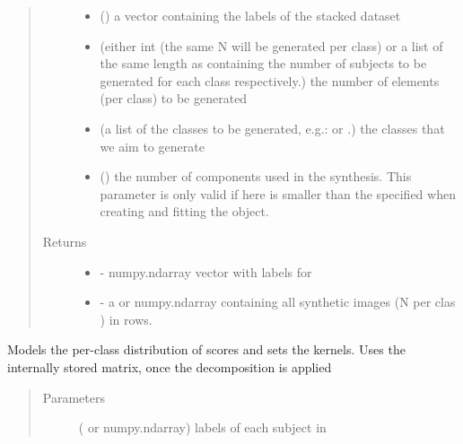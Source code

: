 \documentclass[letterpaper,10pt,english]{sphinxmanual}
\begin{document}
\begin{fulllineitems}
\begin{fulllineitems}
\begin{quote}
\begin{description}
\begin{itemize}
\item {} 
 () \textendash{} a vector containing the labels of the stacked dataset

\item {} 
 (either int (the same N will be generated per class) or a list        of the same length as  containing the number of subjects to         be generated for each class respectively.) \textendash{} the number of elements (per class) to be generated

\item {} 
 (a list of the classes to be generated, e.g.: \sphinxtitleref{{[}0, 2{]}}         or \sphinxtitleref{{[}‘AD’, ‘CTL’{]}}.) \textendash{} the classes that we aim to generate

\item {} 
 () \textendash{} the number of components used in the synthesis.         This parameter is only valid if  here is smaller than the         specified when creating and fitting the         object.

\end{itemize}

\item[{Returns}] \leavevmode
\begin{itemize}
\item {} 
 - numpy.ndarray vector with labels for 

\item {} 
 - a  or numpy.ndarray containing all synthetic             images (N per clas ) in rows.

\end{itemize}


\end{description}\end{quote}

\end{fulllineitems}


\begin{fulllineitems}
\label{\detokenize{api:brainSimulator.BrainSimulator.model}}
Models the per-class distribution of scores and sets the kernels. Uses
the internally stored  matrix, once the decomposition is applied
\begin{quote}\begin{description}
\item[{Parameters}] \leavevmode
{} ( or numpy.ndarray) \textendash{} labels of each subject in 


\end{description}
\end{quote}
\end{fulllineitems}
\end{fulllineitems}
\end{document}
